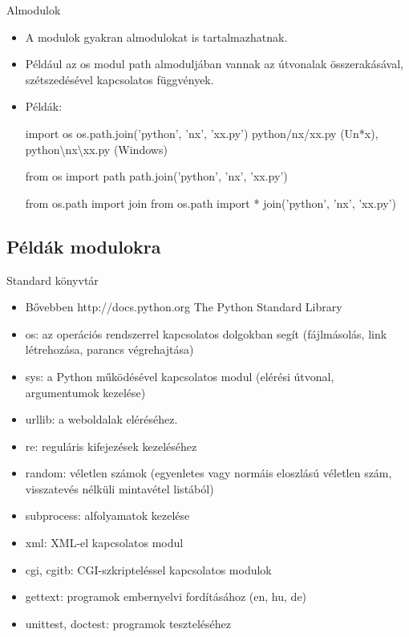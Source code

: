 \begin{frame}[fragile]
  {Almodulok}
  \begin{itemize}
    \item <+-| alert@+> A modulok gyakran almodulokat is
tartalmazhatnak.
    \item <+-| alert@+> Például az os modul path almoduljában vannak az
útvonalak összerakásával, szétszedésével kapcsolatos függvények.
    \item <+-> Példák:
\begin{semiverbatim}
\alert<3>{import os
os.path.join('python', 'nx', 'xx.py')}
\alert<4>{python/nx/xx.py (Un*x),} \alert<5>{python\textbackslash{}nx\textbackslash{}xx.py (Windows)}

\alert<6>{from os import path
path.join('python', 'nx', 'xx.py')}

\alert<7>{from os.path import join}
\alert<8>{from os.path import *}
\alert<7-8>{join('python', 'nx', 'xx.py')}
\end{semiverbatim}
  \end{itemize}
\end{frame}

\subsection{Példák modulokra}
\begin{frame}
  {Standard könyvtár}
  \begin{itemize}
    \item Bővebben http://docs.python.org \alert{The Python Standard
            Library}
    \item os: az operációs rendszerrel kapcsolatos
dolgokban segít (fájlmásolás, link létrehozása, parancs végrehajtása)
    \item sys: a Python működésével kapcsolatos
modul (elérési útvonal, argumentumok kezelése)
    \item urllib: a weboldalak eléréséhez.
    \item re: reguláris kifejezések kezeléséhez
    \item random: véletlen számok (egyenletes vagy normáis
eloszlású véletlen szám, visszatevés nélküli mintavétel listából)
    \item subprocess: alfolyamatok kezelése
    \item xml: XML-el kapcsolatos modul
    \item cgi, cgitb: CGI-szkripteléssel kapcsolatos modulok
    \item gettext: programok embernyelvi fordításához (en, hu, de)
    \item unittest, doctest: programok teszteléséhez
  \end{itemize}
\end{frame}

